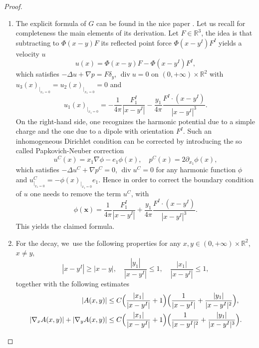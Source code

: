 \documentclass[10pt]{amsart}
\renewcommand{\div}{\operatorname{div}}
\theoremstyle{plain}
\theoremstyle{definition}
\newcommand{\R}{\mathbb{R}}
\begin{document}
\skpt
\begin{proof}
\begin{enumerate}
\item The explicit formula of $G$ can be found in the nice paper \cite[Formula (21)]{Gimbutas_Greengard_Veerapaneni_2015}. Let us recall for completeness the main elements of its derivation. Let $F\in \R^3$, the idea is that subtracting to $\Phi(x-y)F$ its reflected point force $\Phi(x-y^I)F^I$ yields a velocity $u$
\[
u(x)=\Phi(x-y)F-\Phi(x-y^I)F^I,
\]
which satisfies $-\Delta u +\nabla p=F \delta_y$, $\div u=0$ on $(0,+\infty)\times\R^2$ with $u_3(x)_{|_{x_1=0}}=u_2(x)_{|_{x_1=0}}=0$ and
\[
u_1(x)_{|_{x_1=0}}=- \frac{1}{4\pi}\frac{F_1^I}{|x-y^I|}-\frac{y_1}{4\pi} \frac{F^I \cdot (x-y^I)}{|x-y^I|^3}.
\]
On the right-hand side, one recognizes the harmonic potential due to a simple charge and the one due to a dipole with orientation $F^I$.
Such an inhomogeneous Dirichlet condition can be corrected by introducing the so called Papkovich-Neuber correction \cite[Def.\,2.1]{Gimbutas_Greengard_Veerapaneni_2015}
\[
u^C(x)=x_1 \nabla \phi-e_1 \phi(x), \quad p^C(x)=2\partial_{x_1}\phi(x),
\]
which satisfies $-\Delta u^C+\nabla p^C =0$, $\div u^C=0$ for any harmonic function $\phi$ and $u^C_{|_{x_1=0}}=-\phi(x)_{|_{x_1=0}}e_1$. Hence in order to correct the boundary condition of $u$ one needs to remove the term $u^C$, with
\[
\phi(\mathbf{x})=\frac{1}{4\pi}\frac{F_1^I}{|x-y^I|}+\frac{y_1}{4\pi} \frac{F^I \cdot (x-y^I)}{|x-y^I|^3}.
\]
This yields the claimed formula.
\item For the decay, we~use the following properties for any $x, y \in (0,+\infty)\times \R^2 $, $x\neq y$,
\[
|x-y^I|\geq |x-y|, \quad \frac{|y_1|}{|x-y^I|} \leq 1, \quad \frac{|x_1|}{|x-y^I|} \leq 1,
\]
together with the following estimates
\begin{align*}
|A(x,y)| &\leq C \Bigl(\frac{|x_1|}{|x-y^I|}+ 1 \Bigr) \Bigl(\frac{1}{|x-y^I|}+ \frac{|y_1|}{|x-y^I|^2} \Bigr),
\\
|\nabla_x A(x,y)|+|\nabla_y A(x,y)| &\leq C \Bigl(\frac{|x_1|}{|x-y^I|}+ 1 \Bigr) \Bigl(\frac{1}{|x-y^I|^2}+ \frac{|y_1|}{|x-y^I|^3} \Bigr).\qedhere
\end{align*}
\end{enumerate}
\end{proof}
\end{document}
